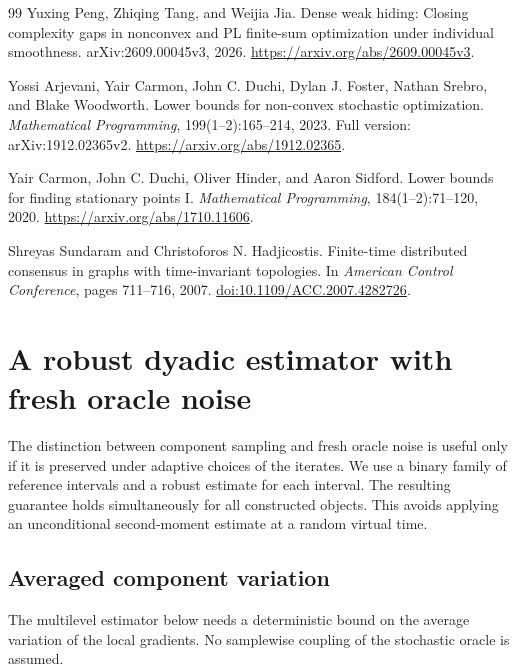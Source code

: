 \documentclass[11pt,a4paper]{article}
\theoremstyle{remark}
\begin{document}
\begin{thebibliography}{99}
Yuxing Peng, Zhiqing Tang, and Weijia Jia.
\newblock Dense weak hiding: Closing complexity gaps in nonconvex and PL
finite-sum optimization under individual smoothness.
\newblock arXiv:2609.00045v3, 2026.
\newblock \url{https://arxiv.org/abs/2609.00045v3}.

Yossi Arjevani, Yair Carmon, John C. Duchi, Dylan J. Foster, Nathan Srebro,
and Blake Woodworth.
\newblock Lower bounds for non-convex stochastic optimization.
\newblock \emph{Mathematical Programming}, 199(1--2):165--214, 2023.
\newblock Full version: arXiv:1912.02365v2.
\newblock \url{https://arxiv.org/abs/1912.02365}.

Yair Carmon, John C. Duchi, Oliver Hinder, and Aaron Sidford.
\newblock Lower bounds for finding stationary points I.
\newblock \emph{Mathematical Programming}, 184(1--2):71--120, 2020.
\newblock \url{https://arxiv.org/abs/1710.11606}.

Shreyas Sundaram and Christoforos N. Hadjicostis.
\newblock Finite-time distributed consensus in graphs with time-invariant
 topologies.
\newblock In \emph{American Control Conference}, pages 711--716, 2007.
\newblock \href{https://doi.org/10.1109/ACC.2007.4282726}{doi:10.1109/ACC.2007.4282726}.

\end{thebibliography}

\clearpage
\appendix
\section{A robust dyadic estimator with fresh oracle noise}
\label{sec:dyadic}

The distinction between component sampling and fresh oracle noise is useful
only if it is preserved under adaptive choices of the iterates.  We use a
binary family of reference intervals and a robust estimate for each interval.
The resulting guarantee holds simultaneously for all constructed objects.
This avoids applying an unconditional second-moment estimate at a random
virtual time.

\subsection{Averaged component variation}
\label{sec:averaged-smoothness}

The multilevel estimator below needs a deterministic bound on the average
variation of the local gradients.  No samplewise coupling of the stochastic
oracle is assumed.
\end{document}
